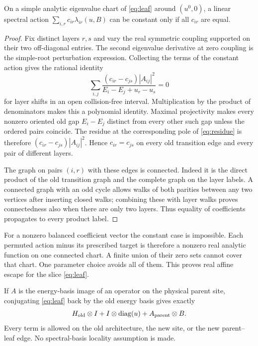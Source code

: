\begin{lemma}\label{lem:rigidity}
On a simple analytic eigenvalue chart of \eqref{eq:leaf} around
$(u^0,0)$, a linear spectral action
$\sum_{i,r}c_{ir}\lambda_{ir}(u,B)$ can be constant only if all
$c_{ir}$ are equal.
\end{lemma}

\begin{proof}
Fix distinct layers $r,s$ and vary the real symmetric coupling supported
on their two off-diagonal entries. The second eigenvalue derivative at
zero coupling is the simple-root perturbation expression.
Collecting the terms of the constant action gives the rational identity
\begin{equation}
 \sum_{i,j}
 \frac{(c_{ir}-c_{js})|A_{ij}|^2}{E_i-E_j+u_r-u_s}=0
 \label{eq:residue}
\end{equation}
for layer shifts in an open collision-free interval. Multiplication
by the product of denominators makes this a polynomial identity.
Maximal projectivity makes every nonzero oriented old gap
$E_i-E_j$ distinct from every other such gap unless the ordered
pairs coincide. The residue at the corresponding pole of
\eqref{eq:residue} is therefore
$(c_{ir}-c_{js})|A_{ij}|^2$. Hence
$c_{ir}=c_{js}$ on every old transition edge and every pair of
different layers.

The graph on pairs $(i,r)$ with these edges is connected.
Indeed it is the direct product of the old transition graph and the
complete graph on the layer labels. A connected graph with an odd
cycle allows walks of both parities between any two vertices after
inserting closed walks; combining these with layer walks proves
connectedness also when there are only two layers. Thus equality of
coefficients propagates to every product label.
\end{proof}

For a nonzero balanced coefficient vector the constant case is
impossible. Each permuted action minus its prescribed target is
therefore a nonzero real analytic function on one connected chart.
A finite union of their zero sets cannot cover that chart.
One parameter choice avoids all of them. This proves real affine
escape for the slice \eqref{eq:leaf}.

If $A$ is the energy-basis image of an operator on the physical parent
site, conjugating \eqref{eq:leaf} back by the old energy basis gives
exactly
\begin{equation}
 H_{\rm old}\otimes I+
 I\otimes\operatorname{diag}(u)+A_{\rm parent}\otimes B.
 \label{eq:physical-leaf}
\end{equation}
Every term is allowed on the old architecture, the new site, or the
new parent--leaf edge. No spectral-basis locality assumption is made.

